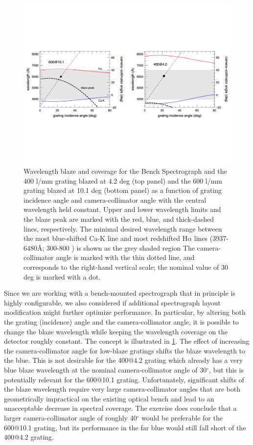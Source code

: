 \begin{figure}[htb]
  \centering
\vskip -1.25in
  \includegraphics[width=\textwidth]{Appendix/figs/blaze_plot_land.pdf}
\vskip -1.25in
\caption[Comparison of coverage and blaze for 400 and 600 l/mm
gratings]{\label{fig:spec_config}\fixspacing Wavelength blaze and
  coverage for the Bench Spectrograph and the 400 l/mm grating blazed
  at 4.2 deg (top panel) and the 600 l/mm grating blazed at 10.1 deg
  (bottom panel) as a function of grating incidence angle and
  camera-collimator angle with the central wavelength held
  constant. Upper and lower wavelength limits and the blaze peak are
  marked with the red, blue, and thick-dashed lines, respectively. The
  minimal desired wavelength range between the most blue-shifted Ca-K
  line and most redshifted H$\alpha$ lines (3937-6480\AA; 300-800
  \kms) is shown as the grey shaded region The camera-collimator angle
  is marked with the thin dotted line, and corresponds to the
  right-hand vertical scale; the nominal value of 30 deg is marked
  with a dot.}
\end{figure}

Since we are working with a bench-mounted spectrograph that in
principle is highly configurable, we also considered if additional
spectrograph layout modification might further optimize
performance. In particular, by altering both the grating (incidence)
angle and the camera-collimator angle, it is possible to change the
blaze wavelength while keeping the wavelength coverage on the detector
roughly constant. The concept is illustrated in \ref{fig:spec_config}.
The effect of increasing the camera-collimator angle for low-blaze
gratings shifts the blaze wavelength to the blue. This is not
desirable for the 400@4.2 grating which already has a very blue blaze
wavelength at the nominal camera-collimator angle of 30$^{\circ}$, but
this is potentially relevant for the 600@10.1 grating. Unfortunately,
significant shifts of the blaze wavelength require very large
camera-collimator angles that are both geometrically impractical on
the existing optical bench and lead to an unacceptable decrease in
spectral coverage. The exercise does conclude that a larger
camera-collimator angle of roughly 40$^{\circ}$ would be preferable
for the 600@10.1 grating, but its performance in the far blue would
still fall short of the 400@4.2 grating.

